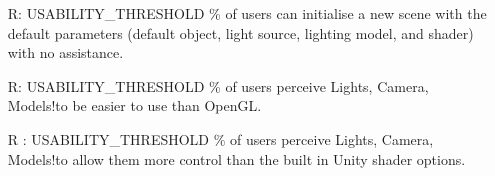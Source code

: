 \documentclass[12pt, titlepage]{article}
\newcounter{reqnum} %
\newcommand{\famname}{Lights, Camera, Models!}
\begin{document}
\begin{itemize}
	USABILITY\_THRESHOLD \% of users can change the parameters of the lighting 
	models and re-render an existing scene with no assistance.
	\item[R\refstepcounter{reqnum}\thereqnum \label{NFR-Usability-new}:] 
	USABILITY\_THRESHOLD \% of users can initialise a new scene with the 
	default parameters (default object, light source, lighting model, and 
	shader) with no assistance.
	\item[R\refstepcounter{reqnum}\thereqnum \label{NFR-Usability-perceived}:] 
	USABILITY\_THRESHOLD \% of users perceive \famname to be easier to use than 
	OpenGL.
	\item[R\refstepcounter{reqnum}\thereqnum 
	\label{NFR-Usability-control-perceived}:] 
	USABILITY\_THRESHOLD \% of users perceive \famname to allow them more 
	control than the built in Unity shader options.
\end{itemize}

\end{document}
